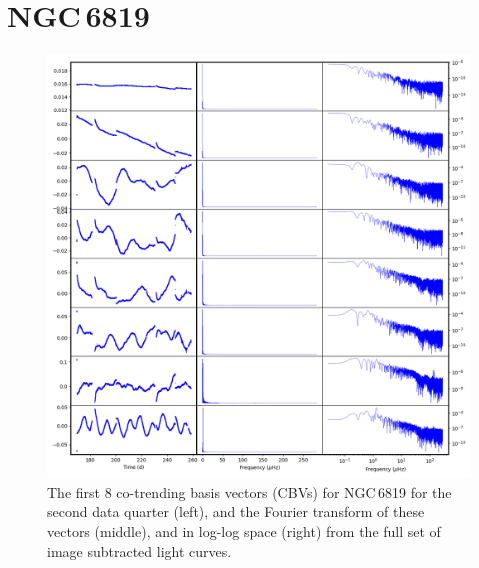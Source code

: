 \section*{NGC\,6819}
\begin{figure}[b]
    \centering
    \includegraphics[width=\linewidth]{Chapter_Appended/AppB/cbv_6819_q02.png}
    \caption{The first 8 co-trending basis vectors (CBVs) for NGC\,6819 for the second data quarter (left), and the Fourier transform of these vectors (middle), and in log-log space (right) from the full set of image subtracted light curves.}
    \label{fig:cbvs_allIS_6819_Q2}
\end{figure}


